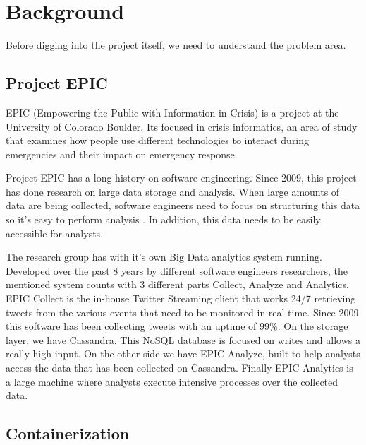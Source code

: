 
\chapter{Background} %

\label{Chapter2} %


Before digging into the project itself, we need to understand the problem area. 

\section{Project EPIC}

EPIC (Empowering the Public with Information in Crisis) is a project at the University of Colorado Boulder. Its focused in crisis informatics, an area of study that examines how people use different technologies to interact during emergencies and their impact on emergency response. 
 
Project EPIC has a long history on software engineering. Since 2009, this project has done research on large data storage and analysis. When large amounts of data are being collected, software engineers need to focus on structuring this data so it’s easy to perform analysis . In addition, this data needs to be easily accessible for analysts.
 
The research group has with it’s own Big Data analytics system running. Developed over the past 8 years by different software engineers researchers, the mentioned system counts with 3 different parts Collect, Analyze and Analytics. EPIC Collect is the in-house Twitter Streaming client that works 24/7 retrieving tweets from the various events that need to be monitored in real time. Since 2009 this software has been collecting tweets with an uptime of 99\%. On the storage layer, we have Cassandra. This NoSQL database is focused on writes and allows a  really high input. On the other side we have EPIC Analyze, built to help analysts access the data that has been collected on Cassandra. Finally EPIC Analytics is a large machine where analysts execute intensive processes over the collected data.

\section{Containerization}

